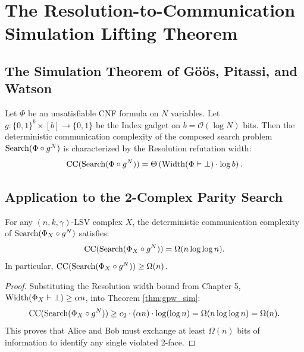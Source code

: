 \chapter{The Resolution-to-Communication Simulation Lifting Theorem}

\section{The Simulation Theorem of Göös, Pitassi, and Watson}
\begin{theorem}\label{thm:gpw_sim}
Let $\Phi$ be an unsatisfiable CNF formula on $N$ variables. Let $g: \{0,1\}^b \times [b] \to \{0,1\}$ be the Index gadget on $b = \mathcal{O}(\log N)$ bits.
Then the deterministic communication complexity of the composed search problem $\mathrm{Search}(\Phi \circ g^N)$ is characterized by the Resolution refutation width:
\[
\mathrm{CC}(\mathrm{Search}(\Phi \circ g^N)) = \Theta\left( \mathrm{Width}(\Phi \vdash \bot) \cdot \log b \right).
\]
\end{theorem}

\section{Application to the 2-Complex Parity Search}
\begin{theorem}
For any $(n, k, \gamma)$-LSV complex $X$, the deterministic communication complexity of $\mathrm{Search}(\Phi_X \circ g^N)$ satisfies:
\[
\mathrm{CC}(\mathrm{Search}(\Phi_X \circ g^N)) = \Omega(n \log \log n).
\]
In particular, $\mathrm{CC}(\mathrm{Search}(\Phi_X \circ g^N)) \ge \Omega(n)$.
\end{theorem}

\begin{proof}
Substituting the Resolution width bound from Chapter 5, $\mathrm{Width}(\Phi_X \vdash \bot) \ge \alpha n$, into Theorem \ref{thm:gpw_sim}:
\[
\mathrm{CC}(\mathrm{Search}(\Phi_X \circ g^N)) \ge c_2 \cdot (\alpha n) \cdot \log (\log n) = \Omega(n \log \log n) = \Omega(n).
\]
This proves that Alice and Bob must exchange at least $\Omega(n)$ bits of information to identify any single violated 2-face.
\end{proof}
